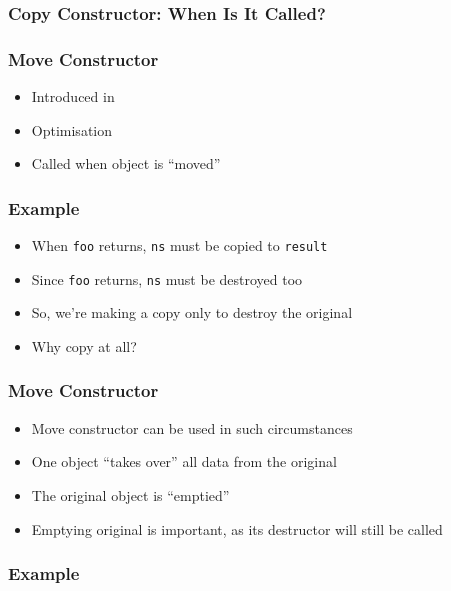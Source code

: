 \documentclass{../ucll-slides}
\begin{document}
\begin{frame}
  \frametitle{Copy Constructor: When Is It Called?}
\end{frame}

\begin{frame}
  \frametitle{Move Constructor}
  \begin{itemize}
    \item Introduced in 
    \item Optimisation
    \item Called when object is ``moved''
  \end{itemize}
\end{frame}

\begin{frame}
  \frametitle{Example}
  \begin{itemize}
    \item When {\tt foo} returns, {\tt ns} must be copied to {\tt result}
    \item Since {\tt foo} returns, {\tt ns} must be destroyed too
    \item So, we're making a copy only to destroy the original
    \item Why copy at all?
  \end{itemize}
\end{frame}

\begin{frame}
  \frametitle{Move Constructor}
  \begin{itemize}
    \item Move constructor can be used in such circumstances
    \item One object ``takes over'' all data from the original
    \item The original object is ``emptied''
    \item Emptying original is important, as its destructor will still be called
  \end{itemize}
\end{frame}

\begin{frame}
  \frametitle{Example}
\end{frame}
\end{document}
